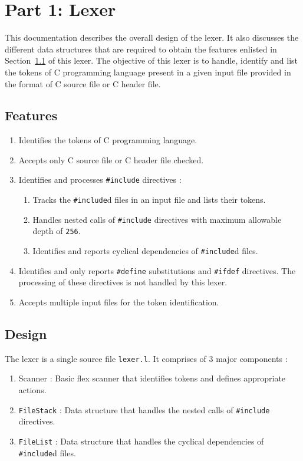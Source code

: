 \documentclass[12pt]{article}
\begin{document}
\section{Part 1: Lexer}

This documentation describes the overall design of the lexer. It also discusses the different data structures that are required to obtain the features enlisted in Section~\ref{Features} of this lexer. 
The objective of this lexer is to handle, identify and list the tokens of C programming language present in a given input file provided in the format of  C source file or C header file.

\subsection{Features}
\label{Features}
\begin{enumerate}
\item Identifies the tokens of C programming language.
\item Accepts only C source file or C header file checked.
\item Identifies and processes \texttt{\#include} directives :
\begin{enumerate}
\item Tracks the \texttt{\#include}d files in an input file and lists their tokens.
\item Handles nested calls of \texttt{\#include} directives with maximum allowable depth of \texttt{256}.
\item Identifies and reports cyclical dependencies of \texttt{\#include}d files.
\end{enumerate}
\item Identifies and only reports \texttt{\#define} substitutions and \texttt{\#ifdef} directives. The processing of these directives is not handled by this lexer. 
\item Accepts multiple input files for the token identification.
\end{enumerate}


\subsection{Design}

The lexer is a single source file \texttt{lexer.l}. It comprises of 3 major components :
\begin{enumerate}
\item Scanner : Basic flex scanner that identifies tokens and defines appropriate actions.
\item \texttt{FileStack} : Data structure that handles the nested calls of \texttt{\#include} directives.
\item \texttt{FileList} :  Data structure that handles the cyclical dependencies of \texttt{\#include}d files.
\end{enumerate}
\end{document}
